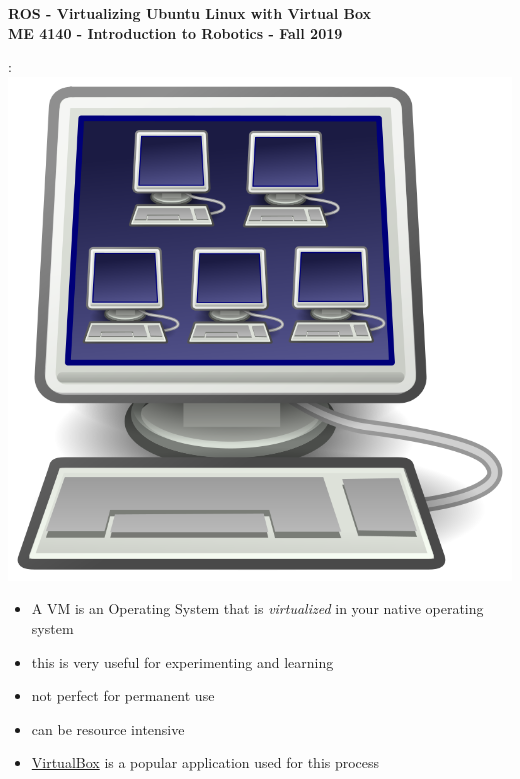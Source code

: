 \documentclass[12pt]{article}
\begin{document}
\thispagestyle{plain}

\begin{center}
   {\bf \Large ROS - Virtualizing Ubuntu Linux with Virtual Box}\vspace{3mm} \\
   {\bf \large ME 4140 - Introduction to Robotics - Fall 2019} \\
\end{center}


\begin{description}
	\vspace{5mm}
 	\item[What is a \href{https://en.wikipedia.org/wiki/Virtual_machine}{Virtual Machine} ?]: \vspace{5mm} \\
      		\includegraphics[scale=.2]{CaptureA.png}\\
            \begin{itemize}
                
                \item A VM is an Operating System that is {\it virtualized} in your native operating system
                \item this is very useful for experimenting and learning 
                \item not perfect for permanent use
                \item can be resource intensive
                \item \href{https://www.virtualbox.org/}{VirtualBox} is a popular application used for this process
                

\end{itemize}
\end{description}
\end{document}

